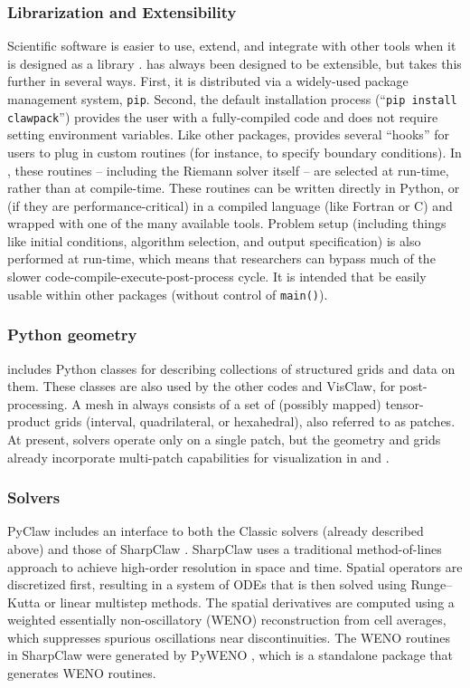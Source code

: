 \subsubsection{Librarization and Extensibility}
Scientific software is easier to use, extend, and integrate with other tools
when it is designed as a library \cite{Brown:2015cj}.  \clawpack has always been
designed to be extensible, but \pyclaw takes this further in several ways.
First, it is distributed via a widely-used package management system,
\texttt{pip}. Second, the default installation process (``\texttt{pip install
clawpack}'') provides the user with a fully-compiled code and does not require
setting environment variables.  Like other \clawpack packages, \pyclaw provides
several ``hooks'' for users to plug in custom routines (for instance, to specify
boundary conditions). In \pyclaw, these routines -- including the Riemann solver
itself -- are selected at run-time, rather than at compile-time.  These routines
can be written directly in Python, or (if they are performance-critical) in a
compiled language (like Fortran or C) and wrapped with one of the many available
tools.  Problem setup (including things like initial conditions, algorithm
selection, and output specification) is also performed at run-time, which means
that researchers can bypass much of the slower code-compile-execute-post-process
cycle. It is intended that \pyclaw be easily usable within other packages
(without control of \texttt{main()}).

\subsubsection{Python geometry}
\pyclaw includes Python classes for describing collections of structured grids
and data on them. These classes are also used by the other codes and
VisClaw, for post-processing.  A mesh in \clawpack always consists of a set of
(possibly mapped) tensor-product
grids (interval, quadrilateral, or hexahedral), also referred to as patches.
At present, \pyclaw solvers operate only on a single patch, but the
geometry and grids already incorporate multi-patch
capabilities for visualization in \amrclaw and \geoclaw.

\subsubsection{\pyclaw Solvers}

PyClaw includes an interface to both the Classic solvers (already
described above) and those of SharpClaw \cite{ketcheson2012pyclaw}.
SharpClaw uses a traditional method-of-lines approach to achieve
high-order resolution in space and time.  Spatial operators are
discretized first, resulting in a system of ODEs that is then solved
using Runge--Kutta or linear multistep methods.  The spatial
derivatives are computed using a weighted essentially non-oscillatory
(WENO) reconstruction from cell averages, which suppresses spurious
oscillations near discontinuities.  The WENO routines in SharpClaw
were generated by PyWENO \cite{pyweno}, which is a standalone package
that generates WENO routines.

